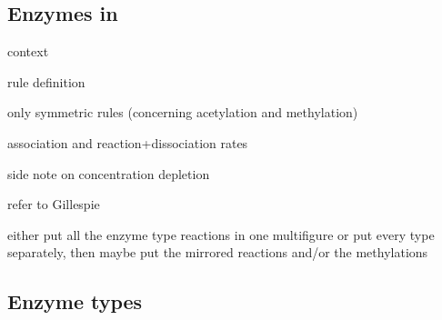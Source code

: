         \subsection{Enzymes in \ed}
            \begin{itemize}
                {
                    \color{red}
                    \item context
                    \item rule definition
                    \item only symmetric rules (concerning acetylation and methylation)
                    \item association and reaction+dissociation rates
                    \item side note on concentration depletion
                    \item refer to Gillespie
                    \item either put all the enzyme type reactions in one multifigure or put every type separately, then maybe put the mirrored reactions and/or the methylations
                }
            \end{itemize}
        \subsection{Enzyme types}
